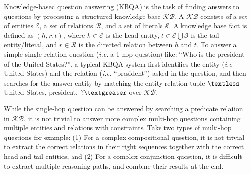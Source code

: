 Knowledge-based question answering (KBQA) is the task of finding answers to questions by processing a structured knowledge base $\mathcal{KB}$. %
A $\mathcal{KB}$ consists of a set of entities $\mathcal{E}$, a set of relations $\mathcal{R}$, and a set of literals $\mathcal{S}$. A knowledge base fact is defined as $(h,r,t)$, where $h\in \mathcal{E}$ is the head entity, $t \in \mathcal{E} \bigcup \mathcal{S}$ is the tail entity/literal, and $r\in \mathcal{R}$ is the directed relation between $h$ and $t$. To answer a simple single-relation question (\emph{i.e.} a 1-hop question) like: ``Who is the president of the United States?'', %
a typical KBQA system first identifies the entity (\emph{i.e.} United States) and the relation (\emph{i.e.} ``president'') asked in the question, and then searches for the answer entity by matching the entity-relation tuple $\textless$United States, president, $?\textgreater$ over $\mathcal{KB}$.


While the single-hop question can be answered by searching a predicate relation in $\mathcal{KB}$, it is not trivial to answer more complex multi-hop questions containing multiple entities and relations with constraints. Take two types of multi-hop questions for example: (1) For a complex compositional question, it is not trivial to extract the correct relations in their right sequences together with the correct head and tail entities, and (2) For a complex conjunction question, it is difficult to extract multiple reasoning paths, and combine their results at the end. 

